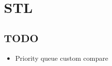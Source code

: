 \section{STL}
    

    

    \subsection{TODO}
    \begin{itemize}
        \item Priority queue custom compare
    \end{itemize}
